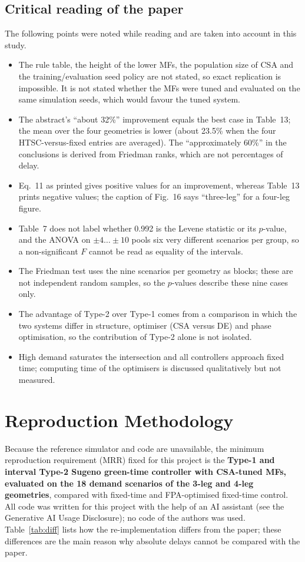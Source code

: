 \subsection*{Critical reading of the paper}
The following points were noted while reading and are taken into account in this study.
\begin{itemize}\setlength\itemsep{0pt}
\item The rule table, the height of the lower MFs, the population size of CSA and the training/evaluation seed policy are not stated, so exact replication is impossible. It is not stated whether the MFs were tuned and evaluated on the same simulation seeds, which would favour the tuned system.
\item The abstract's ``about 32\%'' improvement equals the best case in Table~13; the mean over the four geometries is lower (about 23.5\% when the four HTSC-versus-fixed entries are averaged). The ``approximately 60\%'' in the conclusions is derived from Friedman ranks, which are not percentages of delay.
\item Eq.~11 as printed gives positive values for an improvement, whereas Table~13 prints negative values; the caption of Fig.~16 says ``three-leg'' for a four-leg figure.
\item Table~7 does not label whether 0.992 is the Levene statistic or its $p$-value, and the ANOVA on $\pm4\dots\pm10$ pools six very different scenarios per group, so a non-significant $F$ cannot be read as equality of the intervals.
\item The Friedman test uses the nine scenarios per geometry as blocks; these are not independent random samples, so the $p$-values describe these nine cases only.
\item The advantage of Type-2 over Type-1 comes from a comparison in which the two systems differ in structure, optimiser (CSA versus DE) and phase optimisation, so the contribution of Type-2 alone is not isolated.
\item High demand saturates the intersection and all controllers approach fixed time; computing time of the optimisers is discussed qualitatively but not measured.
\end{itemize}

\section{Reproduction Methodology}
\label{sec:repro}
Because the reference simulator and code are unavailable, the minimum reproduction requirement (MRR) fixed for this project is the
\textbf{Type-1 and interval Type-2 Sugeno green-time controller with CSA-tuned MFs, evaluated on the 18 demand scenarios of the 3-leg and 4-leg geometries}, compared with
fixed-time and FPA-optimised fixed-time control. All code was written for this project with the help of an AI assistant (see the Generative AI Usage Disclosure); no code of the authors was used. Table~\ref{tab:diff} lists how the
re-implementation differs from the paper; these differences are the main reason why absolute delays cannot be compared with the paper.

